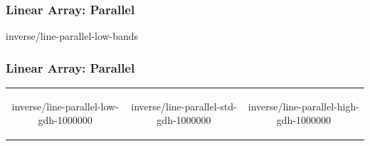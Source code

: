 % 

\begin{frame}\frametitle{Linear Array: Parallel}
\center
	\begin{overpic}[ scale = 0.55 ]
		{\pLocalGraphics inverse/line-parallel-low-bands}
	\end{overpic}
\end{frame}
%

\begin{frame}\frametitle{Linear Array: Parallel}
\begin{table}[htp]
\begin{center}
	\begin{tabular}{ccc}
		\begin{overpic}[ scale = 0.325 ] {\pLocalGraphics inverse/line-parallel-low-gdh-1000000} \end{overpic} &
		\begin{overpic}[ scale = 0.325 ] {\pLocalGraphics inverse/line-parallel-std-gdh-1000000} \end{overpic} &
		\begin{overpic}[ scale = 0.325 ] {\pLocalGraphics inverse/line-parallel-high-gdh-1000000} \end{overpic} 
	\end{tabular}
\end{center}
\end{table}
\end{frame}

\endinput  %
